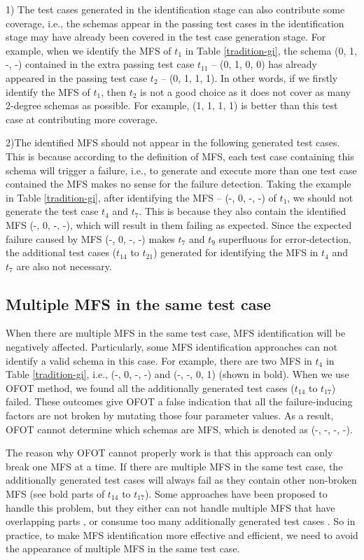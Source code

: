 \documentclass[10pt,journal,compsoc]{IEEEtran}
\begin{document}
1) The test cases generated in the identification stage can also contribute some coverage, i.e., the schemas appear in the passing test cases in the identification stage may have already been covered in the test case generation stage. For example, when we identify the MFS of $t_{1}$ in Table \ref{tradition-gi}, the schema (0, 1, -, -) contained in the extra passing test case $t_{11}$ -- (0, 1, 0, 0) has already appeared in the passing test case $t_{2}$ -- (0, 1, 1, 1). In other words, if we firstly identify the MFS of $t_{1}$, then $t_{2}$ is not a good choice as it does not cover as many 2-degree schemas as possible. For example, (1, 1, 1, 1) is better than this test case at contributing more coverage.

2)The identified MFS should not appear in the following generated test cases.  This is because according to the definition of MFS, each test case containing this schema will trigger a failure, i.e., to generate and execute more than one test case contained the MFS makes no sense for the failure detection. Taking the example in Table \ref{tradition-gi}, after identifying the MFS -- (-, 0, -, -) of $t_{1}$, we should not generate the test case $t_{4}$ and $t_{7}$. This is because they also contain the identified MFS (-, 0, -, -), which will result in them failing as expected. Since the expected failure caused by MFS (-, 0, -, -) makes $t_{7}$ and $t_{9}$ superfluous for error-detection, the additional test cases ($t_{14}$ to $t_{21}$) generated for identifying the MFS in $t_{4}$ and $t_{7}$ are also not necessary.


\subsection{Multiple MFS in the same test case}\label{sec:moti:multi}
When there are multiple MFS in the same test case, MFS identification will be negatively affected. Particularly, some MFS identification approaches can not identify a valid schema in this case. For example, there are two MFS in $t_{4}$ in Table \ref{tradition-gi}, i.e., (-, 0, -, -) and (-, -, 0, 1) (shown in bold). When we use OFOT method, we found all the additionally generated test cases ($t_{14}$ to $t_{17}$) failed. These outcomes give OFOT a false indication that all the failure-inducing factors are not broken by mutating those four parameter values.  As a result, OFOT cannot determine which schemas are MFS, which is denoted as (-, -, -, -).

The reason why OFOT cannot properly work is that this approach can only break one MFS at a time. If there are multiple MFS in the same test case, the additionally generated test cases will always fail as they contain other non-broken MFS (see bold parts of $t_{14}$ to $t_{17}$). Some approaches have been proposed to handle this problem, but they either can not handle multiple MFS that have overlapping parts \cite{zhang2011characterizing}, or consume too many additionally generated test cases \cite{wang2010adaptive,niu2013identifying}. So in practice, to make MFS identification more effective and efficient, we need to avoid the appearance of multiple MFS in the same test case.
\end{document}
